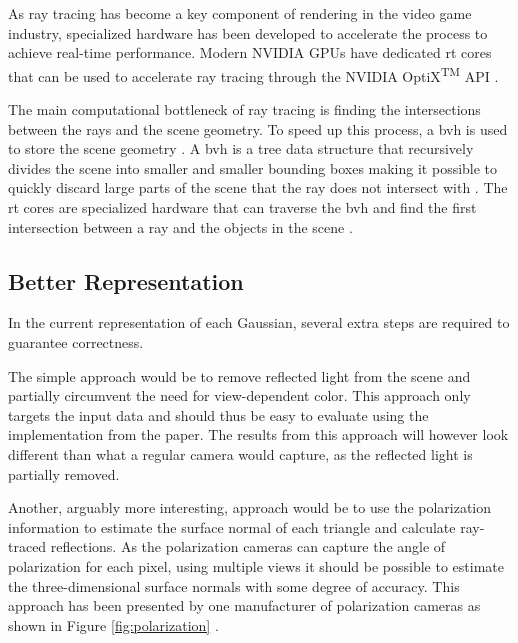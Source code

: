 As ray tracing has become a key component of rendering in the video game industry, specialized hardware has been developed to accelerate the process to achieve real-time performance.
Modern NVIDIA GPUs have dedicated \gls{rt} cores that can be used to accelerate ray tracing through the NVIDIA OptiX\textsuperscript{TM} API \cite{nvidiaNVIDIAOptiXProgramming2023}.

The main computational bottleneck of ray tracing is finding the intersections between the rays and the scene geometry.
To speed up this process, a \gls{bvh} is used to store the scene geometry \cite{nvidiaNVIDIAOptiXProgramming2023}.
A \gls{bvh} is a tree data structure that recursively divides the scene into smaller and smaller bounding boxes making it possible to quickly discard large parts of the scene that the ray does not intersect with \cite{nvidiaNVIDIAOptiXProgramming2023}.
The \gls{rt} cores are specialized hardware that can traverse the \gls{bvh} and find the first intersection between a ray and the objects in the scene \cite{nvidiaNVIDIAOptiXProgramming2023}.

\subsection{Better Representation}
In the current representation of each Gaussian, several extra steps are required to guarantee correctness.





The simple approach would be to remove reflected light from the scene and partially circumvent the need for view-dependent color.
This approach only targets the input data and should thus be easy to evaluate using the implementation from the paper.
The results from this approach will however look different than what a regular camera would capture, as the reflected light is partially removed.

Another, arguably more interesting, approach would be to use the polarization information to estimate the surface normal of each triangle and calculate ray-traced reflections.
As the polarization cameras can capture the angle of polarization for each pixel, using multiple views it should be possible to estimate the three-dimensional surface normals with some degree of accuracy.
This approach has been presented by one manufacturer of polarization cameras as shown in Figure \ref{fig:polarization} \cite{lucidvisionlabs3DDepthSurface2021}.






